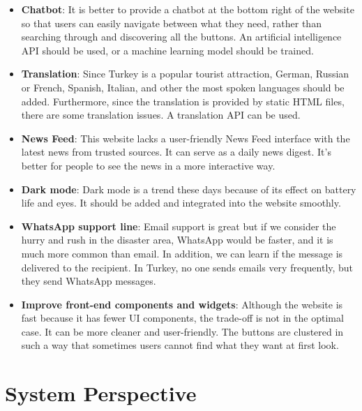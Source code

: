 \documentclass[listof=nochaptergap]{report}
\begin{document}
\begin{itemize}
    \item \textbf{Chatbot}: It is better to provide a chatbot at the bottom right of the website so that users can easily navigate between what they need, rather than searching through and discovering all the buttons. An artificial intelligence API should be used, or a machine learning model should be trained.
    
    \item \textbf{Translation}: Since Turkey is a popular tourist attraction, German, Russian or French, Spanish, Italian, and other the most spoken languages should be added. Furthermore, since the translation is provided by static HTML files, there are some translation issues. A translation API can be used.

    \item \textbf{News Feed}: This website lacks a user-friendly News Feed interface with the latest news from trusted sources. It can serve as a daily news digest. It's better for people to see the news in a more interactive way.

    \item \textbf{Dark mode}: Dark mode is a trend these days because of its effect on battery life and eyes. It should be added and integrated into the website smoothly.

    \item \textbf{WhatsApp support line}: Email support is great but if we consider the hurry and rush in the disaster area, WhatsApp would be faster, and it is much more common than email. In addition, we can learn if the message is delivered to the recipient. In Turkey, no one sends emails very frequently, but they send WhatsApp messages.

    \item \textbf{Improve front-end components and widgets}: Although the website is fast because it has fewer UI components, the trade-off is not in the optimal case. It can be more cleaner and user-friendly. The buttons are clustered in such a way that sometimes users cannot find what they want at first look.
    
\end{itemize}

\section{System Perspective}
\end{document}

